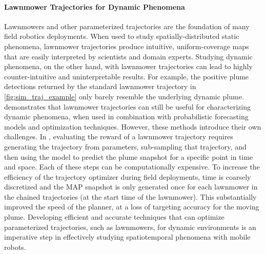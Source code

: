 \paragraph{Lawnmower Trajectories for Dynamic Phenomena}
Lawnmowers and other parameterized trajectories are the foundation of many field robotics deployments. When used to study spatially-distributed static phenomena, lawnmower trajectories produce intuitive, uniform-coverage maps that are easily interpreted by scientists and domain experts. Studying dynamic phenomena, on the other hand, with lawnmower trajectories can lead to highly counter-intuitive and uninterpretable results. For example, the positive plume detections returned by the standard lawnmower trajectory in \cref{fig:sim_traj_example} only barely resemble the underlying dynamic plume. \PHORTEX demonstrates that lawnmower trajectories can still be useful for characterizing dynamic phenomena, when used in combination with probabilistic forecasting models and optimization techniques. However, these methods introduce their own challenges. In \PHORTEX, evaluating the reward of a lawnmower trajectory requires generating the trajectory from parameters, sub-sampling that trajectory, and then using the \PHUMES model to predict the plume snapshot for a specific point in time and space. Each of these steps can be computationally expensive. To increase the efficiency of the trajectory optimizer during field deployments, time is coarsely discretized and the MAP \PHUMES snapshot is only generated once for each lawnmower in the chained trajectories (at the start time of the lawnmower). This substantially improved the speed of the planner, at a loss of targeting accuracy for the moving plume. Developing efficient and accurate techniques that can optimize parameterized trajectories, such as lawnmowers, for dynamic environments is an imperative step in effectively studying spatiotemporal phenomena with mobile robots.

